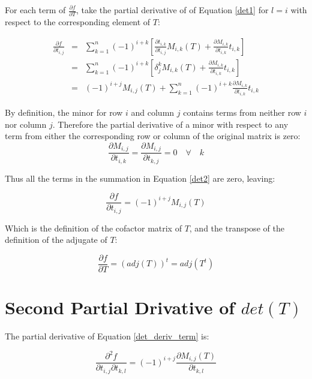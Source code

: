 \documentclass{report}
\begin{document}
For each term of $\frac{\partial f}{\partial T}$, take the partial derivative of of Equation \ref{det1} for $l = i$ with respect to the corresponding element of $T$:

\begin{eqnarray}
\frac{\partial f}{\partial t_{i,j}} &=& 
\sum_{k=1}^n (-1)^{i+k} \left[
 \frac{\partial t_{i,k}}{\partial t_{i,j}} M_{i,k}(T) + 
 \frac{\partial M_{i,k}}{\partial t_{i,k}} t_{i,k} \right] \\
 &=& \sum_{k=1}^n (-1)^{i+k} \left[
 \delta^k_j M_{i,k}(T) + 
 \frac{\partial M_{i,k}}{\partial t_{i,k}} t_{i,k} \right] \\
\label{det2}
 &=& (-1)^{i+j} M_{i,j}(T) + \sum_{k=1}^n (-1)^{i+k} \frac{\partial 
   M_{i,k}}{\partial t_{i,k}} t_{i,k}
\end{eqnarray}

By definition, the minor for row $i$ and column $j$ contains terms from neither row $i$ nor column $j$. Therefore the partial derivative of a minor with respect to any term from either the corresponding row or column of the original matrix is zero:
\begin{equation}\label{det3}
\frac{\partial M_{i,j}}{\partial t_{i,k}} = 
\frac{\partial M_{i,j}}{\partial t_{k,j}} = 0 \quad \forall \quad k
\end{equation}

Thus all the terms in the summation in Equation \ref{det2} are zero, leaving:

\begin{equation}\label{det_deriv_term}
\frac{\partial f}{\partial t_{i,j}} = (-1)^{i+j}M_{i,j}(T)
\end{equation}

Which is the definition of the cofactor matrix of $T$, and the transpose of the definition of the adjugate of $T$:

\begin{equation}
\frac{\partial f}{\partial T} = (adj(T))^t = adj(T^t)
\end{equation}

\section{Second Partial Drivative of $det(T)$}

The partial derivative of Equation \ref{det_deriv_term} is:

\begin{equation}
\frac{\partial^2 f}{\partial t_{i,j} \partial t_{k,l}} = (-1)^{i+j}\frac{\partial M_{i,j}(T)}{\partial t_{k,l}}
\end{equation}
\end{document}
